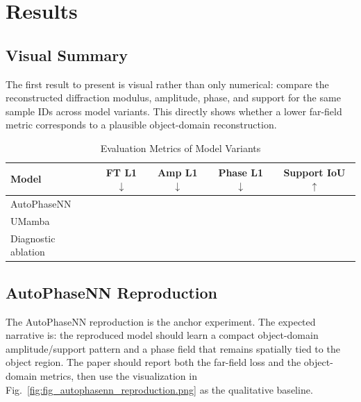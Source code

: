 \section{Results}

\subsection{Visual Summary}
The first result to present is visual rather than only numerical: compare the
reconstructed diffraction modulus, amplitude, phase, and support for the same
sample IDs across model variants. This directly shows whether a lower
far-field metric corresponds to a plausible object-domain reconstruction.





\begin{table}[!t]
  \caption{Evaluation Metrics of Model Variants}
  \label{tab:main_results}
  \centering
  \begin{tabular}{lcccc}
    \toprule
    Model & FT L1 $\downarrow$ & Amp L1 $\downarrow$ & Phase L1 $\downarrow$ & Support IoU $\uparrow$ \\
    \midrule
    AutoPhaseNN & \todo{} & \todo{} & \todo{} & \todo{} \\
    UMamba & \todo{} & \todo{} & \todo{} & \todo{} \\
    Diagnostic ablation & \todo{} & \todo{} & \todo{} & \todo{} \\
    \bottomrule
  \end{tabular}
\end{table}

\subsection{AutoPhaseNN Reproduction}
The AutoPhaseNN reproduction is the anchor experiment. The expected narrative is:
the reproduced model should learn a compact object-domain amplitude/support
pattern and a phase field that remains spatially tied to the object region. The
paper should report both the far-field loss and the object-domain metrics, then
use the visualization in Fig.~\ref{fig:fig_autophasenn_reproduction.png} as the
qualitative baseline.

